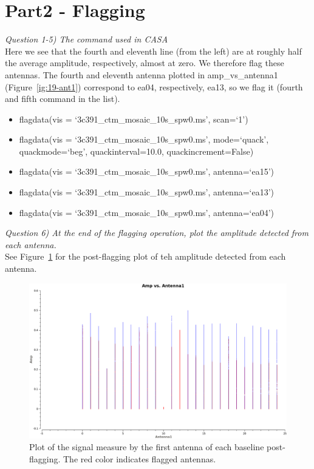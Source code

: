 \documentclass[12pt, a4paper]{article}
\begin{document}
\section{Part2 - Flagging}
\noindent \textit{Question 1-5) The command used in CASA} \\
Here we see that the fourth and eleventh line (from the left) are at roughly half the average amplitude, respectively, almost at zero. We therefore flag these antennas. The fourth and eleventh antenna plotted in amp\_vs\_antenna1 (Figure~\ref{ig:19-ant1}) correspond to ea04, respectively, ea13, so we flag it (fourth and fifth command in the list). \\
\begin{itemize}
    \item flagdata(vis = `3c391\_ctm\_mosaic\_10s\_spw0.ms', scan=`1')
    \item flagdata(vis = `3c391\_ctm\_mosaic\_10s\_spw0.ms', mode=`quack', quackmode=`beg', quackinterval=10.0, quackincrement=False)
    \item flagdata(vis = `3c391\_ctm\_mosaic\_10s\_spw0.ms', antenna=`ea15')
    \item flagdata(vis = `3c391\_ctm\_mosaic\_10s\_spw0.ms', antenna=`ea13')
    \item flagdata(vis = `3c391\_ctm\_mosaic\_10s\_spw0.ms', antenna=`ea04')
\end{itemize}

\noindent \textit{Question 6) At the end of the flagging operation, plot the amplitude detected from each antenna.}  \\
See Figure~\ref{fig:part2-q6} for the post-flagging plot of teh amplitude detected from each antenna.
\begin{figure}
    \centering
    \includegraphics[scale=0.3]{../Imaging/plots/amp_vs_antenna1_part2_vraag6_with_display-FlaggedPointsSymbol-custom.png}
    \caption{Plot of the signal measure by the first antenna of each baseline post-flagging. The red color indicates flagged antennas. \label{fig:part2-q6}}
\end{figure}
\end{document}
